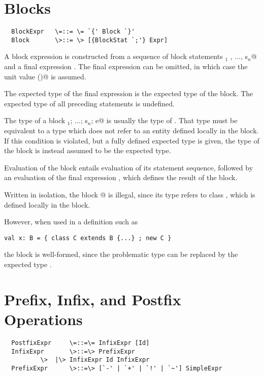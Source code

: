 \documentclass[11pt]{report}
\begin{document}
\section{Blocks}
\label{sec:blocks}

\syntax\begin{verbatim}
  BlockExpr   \=::= \= `{' Block `}'
  Block       \>::= \> [{BlockStat `;'} Expr]
\end{verbatim}

A block expression
 is constructed from a sequence of block statements \verb@s$_1$
, ..., s$_n$@ and a final expression \verb@e@. The final expression
can be omitted, in which case the unit value \verb@()@ is assumed.


The expected type of the final expression \verb@e@ is the expected
type of the block. The expected type of all preceding statements is
undefined.

The type of a block \verb@s$_1$; ...; s$_n$; e@ is usually the type of
\verb@e@.  That type must be equivalent to a type which does not refer
to an entity defined locally in the block. If this condition is
violated, but a fully defined expected type is given, the type of the
block is instead assumed to be the expected type.

Evaluation of the block entails evaluation of its statement sequence,
followed by an evaluation of the final expression \verb@e@, which
defines the result of the block.

\example
Written in isolation, 
the block @ is illegal, since its type
refers to class \verb@C@, which is defined locally in the block.

However, when used in a definition such as 
\begin{verbatim}
val x: B = { class C extends B {...} ; new C }
\end{verbatim}
the block is well-formed, since the problematic type \verb@C@ can be
replaced by the expected type \verb@B@.

\section{Prefix, Infix, and Postfix Operations}
\label{sec:infix-operations}

\syntax\begin{verbatim}
  PostfixExpr     \=::=\= InfixExpr [Id]
  InfixExpr       \>::=\> PrefixExpr
		  \>  |\> InfixExpr Id InfixExpr
  PrefixExpr      \>::=\> [`-' | `+' | `!' | `~'] SimpleExpr 
\end{verbatim}
\end{document}
